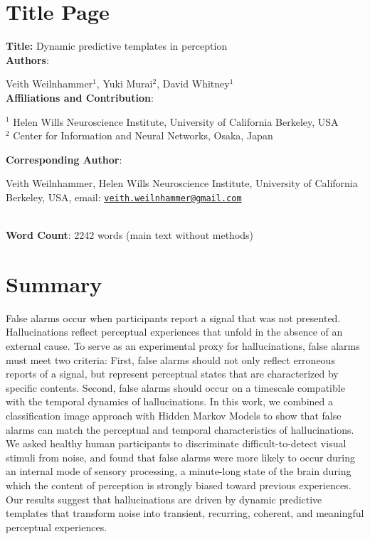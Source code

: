 \documentclass[
]{article}
\author{}
\date{\vspace{-2.5em}}
\begin{document}
\hypertarget{title-page}{%
\section{Title Page}\label{title-page}}

\textbf{Title:} Dynamic predictive templates in perception\\

\textbf{Authors}:

Veith Weilnhammer\(^{1}\), Yuki Murai\(^{2}\), David Whitney\(^{1}\)\\

\hfill\break
\textbf{Affiliations and Contribution}:

\(^{1}\) Helen Wills Neuroscience Institute, University of California
Berkeley, USA\\
\(^{2}\) Center for Information and Neural Networks, Osaka, Japan\\

\hfill\break

\textbf{Corresponding Author}:

Veith Weilnhammer, Helen Wills Neuroscience Institute, University of
California Berkeley, USA, email:
\href{mailto:veith.weilnhammer@gmail.com}{\nolinkurl{veith.weilnhammer@gmail.com}}\\
\strut \\
\textbf{Word Count}: 2242 words (main text without methods)\\

\newpage
\linenumbers

\hypertarget{summary}{%
\section{Summary}\label{summary}}

False alarms occur when participants report a signal that was not
presented. Hallucinations reflect perceptual experiences that unfold in
the absence of an external cause. To serve as an experimental proxy for
hallucinations, false alarms must meet two criteria: First, false alarms
should not only reflect erroneous reports of a signal, but represent
perceptual states that are characterized by specific contents. Second,
false alarms should occur on a timescale compatible with the temporal
dynamics of hallucinations. In this work, we combined a classification
image approach with Hidden Markov Models to show that false alarms can
match the perceptual and temporal characteristics of hallucinations. We
asked healthy human participants to discriminate difficult-to-detect
visual stimuli from noise, and found that false alarms were more likely
to occur during an internal mode of sensory processing, a minute-long
state of the brain during which the content of perception is strongly
biased toward previous experiences. Our results suggest that
hallucinations are driven by dynamic predictive templates that transform
noise into transient, recurring, coherent, and meaningful perceptual
experiences.
\end{document}

